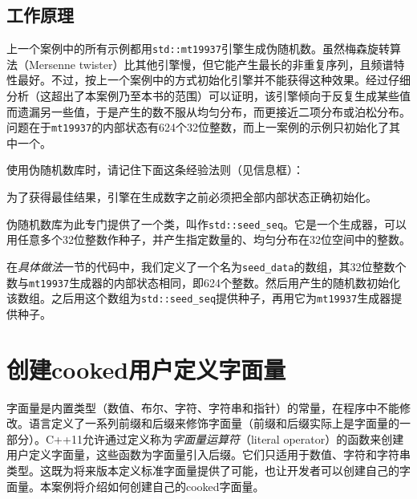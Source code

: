 
\subsection{工作原理}



上一个案例中的所有示例都用\texttt{std::\allowbreak{}mt19937}引擎生成伪随机数。虽然梅森旋转算法（Mersenne twister）比其他引擎慢，但它能产生最长的非重复序列，且频谱特性最好。不过，按上一个案例中的方式初始化引擎并不能获得这种效果。经过仔细分析（这超出了本案例乃至本书的范围）可以证明，该引擎倾向于反复生成某些值而遗漏另一些值，于是产生的数不服从均匀分布，而更接近二项分布或泊松分布。问题在于\texttt{mt19937}的内部状态有624个32位整数，而上一案例的示例只初始化了其中一个。



使用伪随机数库时，请记住下面这条经验法则（见信息框）：



\begin{myNote}
为了获得最佳结果，引擎在生成数字之前必须把全部内部状态正确初始化。
\end{myNote}



伪随机数库为此专门提供了一个类，叫作\texttt{std::\allowbreak{}seed\_\allowbreak{}seq}。它是一个生成器，可以用任意多个32位整数作种子，并产生指定数量的、均匀分布在32位空间中的整数。



在\textit{具体做法}一节的代码中，我们定义了一个名为\texttt{seed\_\allowbreak{}data}的数组，其32位整数个数与\texttt{mt19937}生成器的内部状态相同，即624个整数。然后用产生的随机数初始化该数组。之后用这个数组为\texttt{std::\allowbreak{}seed\_\allowbreak{}seq}提供种子，再用它为\texttt{mt19937}生成器提供种子。



\section{创建cooked用户定义字面量}



字面量是内置类型（数值、布尔、字符、字符串和指针）的常量，在程序中不能修改。语言定义了一系列前缀和后缀来修饰字面量（前缀和后缀实际上是字面量的一部分）。C++11允许通过定义称为\textit{字面量运算符}（literal operator）的函数来创建用户定义字面量，这些函数为字面量引入后缀。它们只适用于数值、字符和字符串类型。这既为将来版本定义标准字面量提供了可能，也让开发者可以创建自己的字面量。本案例将介绍如何创建自己的cooked字面量。


